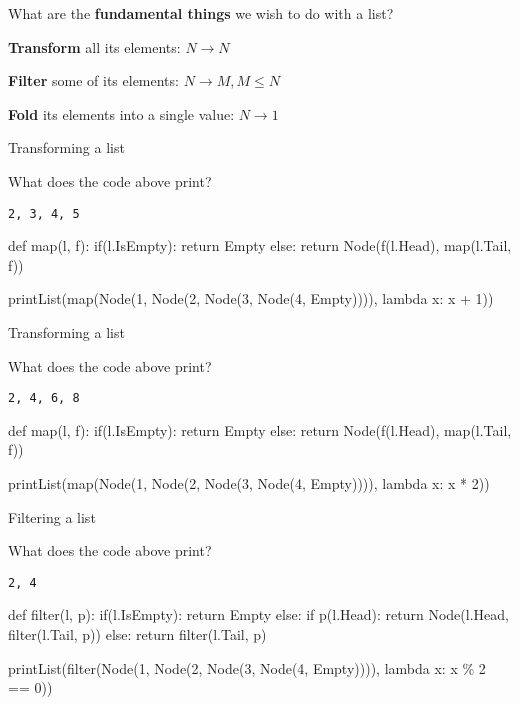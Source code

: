 \documentclass{beamer}
\begin{document}
\begin{slide}{
\item What are the \textbf{fundamental things} we wish to do with a list?
\pause
\item \textbf{Transform} all its elements: $N \rightarrow N$
\pause
\item \textbf{Filter} some of its elements: $N \rightarrow M, M \leq N$
\pause
\item \textbf{Fold} its elements into a single value: $N \rightarrow 1$
}\end{slide}

\begin{frame}[fragile]{Transforming a list}
\begin{codewithblock}{\item What does the code above print? \pause \item \texttt{2, 3, 4, 5}}
def map(l, f):
  if(l.IsEmpty):
    return Empty
  else:
    return Node(f(l.Head), map(l.Tail, f))

printList(map(Node(1, Node(2, Node(3, Node(4, Empty)))), lambda x: x + 1))
\end{codewithblock}
\end{frame}

\begin{frame}[fragile]{Transforming a list}
\begin{codewithblock}{\item What does the code above print? \pause \item \texttt{2, 4, 6, 8}}
def map(l, f):
  if(l.IsEmpty):
    return Empty
  else:
    return Node(f(l.Head), map(l.Tail, f))

printList(map(Node(1, Node(2, Node(3, Node(4, Empty)))), lambda x: x * 2))
\end{codewithblock}
\end{frame}

\begin{frame}[fragile]{Filtering a list}
\begin{codewithblock}{\item What does the code above print? \pause \item \texttt{2, 4}}
def filter(l, p):
  if(l.IsEmpty):
    return Empty
  else:
    if p(l.Head):
      return Node(l.Head, filter(l.Tail, p))
    else:
      return filter(l.Tail, p)

printList(filter(Node(1, Node(2, Node(3, Node(4, Empty)))), lambda x: x \% 2 == 0))
\end{codewithblock}
\end{frame}
\end{document}

